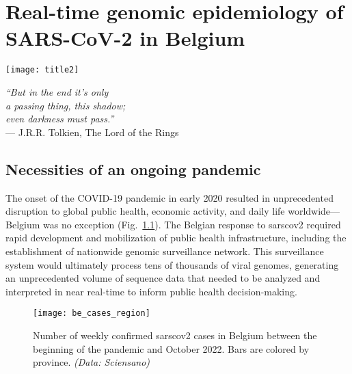 \chapter{Real-time genomic epidemiology of SARS-CoV-2 in Belgium}\label{ch:chapter1}

\begin{minipage}[b]{0.57\textwidth}
    \texttt{[image: title2]} %
  \end{minipage}
  \hfill
  \begin{minipage}[b]{0.35\textwidth}
    \footnotesize
    \begin{flushright}
      \textit{``But in the end it's only\\a passing thing, this shadow;\\even darkness must pass.''} \\
      --- J.R.R.
Tolkien, The Lord of the Rings
    \end{flushright}
    \vspace{2cm}
\end{minipage}
  
\clearpage

\onehalfspacing

\section{Necessities of an ongoing pandemic}
The onset of the COVID-19 pandemic in early 2020 resulted in unprecedented disruption to global public health, economic activity, and daily life worldwide---Belgium was no exception (Fig.~\ref{fig:beCaseCountsRegion}).
The Belgian response to \gls{sarscov2} required rapid development and mobilization of public health infrastructure, including the establishment of nationwide genomic surveillance network.
This surveillance system would ultimately process tens of thousands of viral genomes, generating an unprecedented volume of sequence data that needed to be analyzed and interpreted in near real-time to inform public health decision-making.

\begin{figure}[ht]
  \centering
  \texttt{[image: be\_cases\_region]}
  \caption[COVID-19 cases in Belgium by province]{Number of weekly confirmed \gls{sarscov2} cases in Belgium between the beginning of the pandemic and October 2022. Bars are colored by province. \textit{(Data: Sciensano)}}
  \label{fig:beCaseCountsRegion}
\end{figure}


